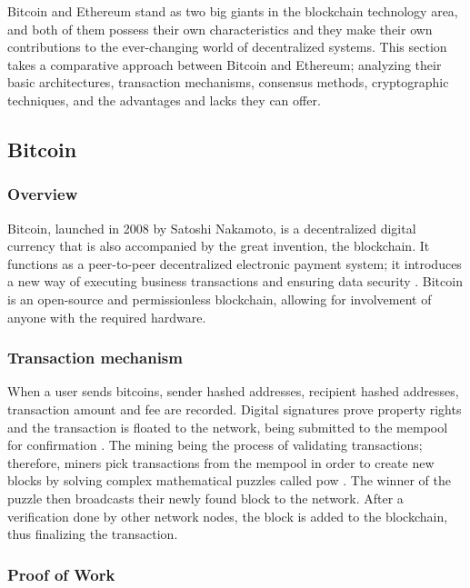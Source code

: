 Bitcoin and Ethereum stand as two big giants in the blockchain technology area, and both of them possess their own characteristics and they make their own contributions to the ever-changing world of decentralized systems.
This section takes a comparative approach between Bitcoin and Ethereum; analyzing their basic architectures, transaction mechanisms, consensus methods, cryptographic techniques, and the advantages and lacks they can offer.

\subsection{Bitcoin} \label{subsec:bitcoin}

\subsubsection{Overview}

Bitcoin, launched in 2008 by Satoshi Nakamoto, is a decentralized digital currency that is also accompanied by the great invention, the blockchain. It functions as a 
peer-to-peer decentralized electronic payment system; it introduces a new way of executing business transactions and ensuring data security \cite{9129332}. Bitcoin is an open-source 
and permissionless blockchain, allowing for involvement of anyone with the required hardware.

\subsubsection{Transaction mechanism}

When a user sends bitcoins, sender hashed addresses, recipient hashed addresses, transaction amount and fee are recorded. Digital signatures prove property rights and the transaction 
is floated to the network, being submitted to the mempool for confirmation \cite{bitcoincom}. The mining being the process of validating transactions; therefore, miners pick transactions 
from the \gls{mempool} in order to create new blocks by solving complex mathematical puzzles called \gls{pow} \cite{9129332}. The winner of the puzzle then 
broadcasts their newly found block to the network. After a verification done by other network nodes, the block is added to the blockchain, thus finalizing the transaction.

\subsubsection{Proof of Work}

